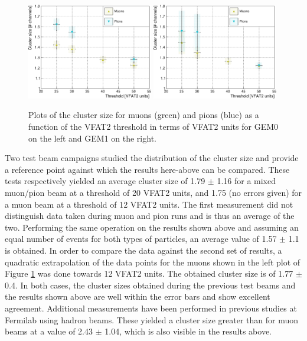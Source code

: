       \begin{figure}[h!]
        \centering
        \includegraphics[width=0.49\textwidth]{img/plots/cClusterSize_Threshold_GEM0-crop}
        \includegraphics[width=0.49\textwidth]{img/plots/cClusterSize_Threshold_GEM1-crop}
        \caption{Plots of the cluster size for muons (green) and pions (blue) as a function of the VFAT2 threshold in terms of VFAT2 units for GEM0 on the left and GEM1 on the right.}
        \label{fig:II-3-data-clu-size}
      \end{figure}

      Two test beam campaigns \cite{Abbaneo:1401079, Abbaneo:1494965} studied the distribution of the cluster size and provide a reference point against which the results here-above can be compared. These tests respectively yielded an average cluster size of 1.79 $\pm$ 1.16 for a mixed muon/pion beam at a threshold of 20 VFAT2 units, and 1.75 (no errors given) for a muon beam at a threshold of 12 VFAT2 units. The first measurement did not distinguish data taken during muon and pion runs and is thus an average of the two. Performing the same operation on the results shown above and assuming an equal number of events for both types of particles, an average value of 1.57 $\pm$ 1.1 is obtained. In order to compare the data against the second set of results, a quadratic extrapolation of the data points for the muons shown in the left plot of Figure \ref{fig:II-3-data-clu-size} was done towards 12 VFAT2 units. The obtained cluster size is of 1.77 $\pm$ 0.4. In both cases, the cluster sizes obtained during the previous test beams and the results shown above are well within the error bars and show excellent agreement. Additional measurements have been performed in previous studies \cite{Abbaneo:1973272} at Fermilab using hadron beams. These yielded a cluster size greater than for muon beams at a value of 2.43 $\pm$ 1.04, which is also visible in the results above. \\


